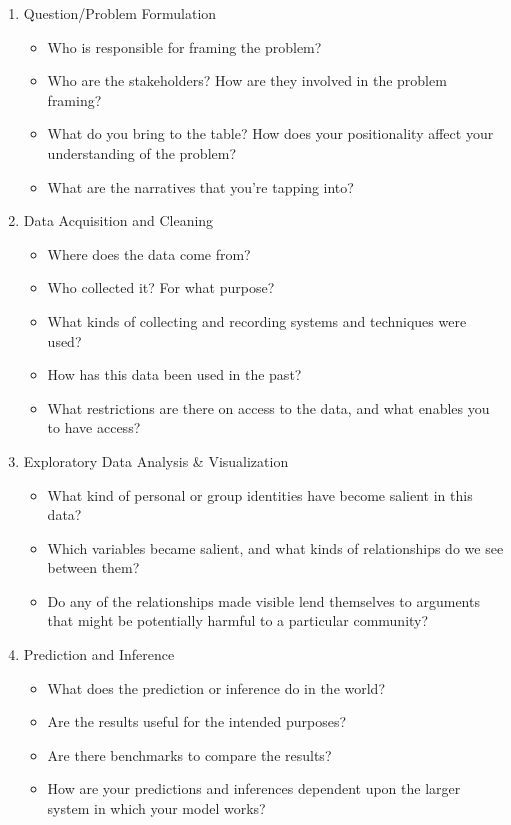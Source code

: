 \documentclass[
  letterpaper,
  DIV=11,
  numbers=noendperiod]{scrreprt}
\providecommand{\tightlist}{%
  \setlength{\itemsep}{0pt}\setlength{\parskip}{0pt}}\usepackage{longtable,booktabs,array}
\begin{document}
\begin{enumerate}
\def\labelenumi{\arabic{enumi}.}
\item
  Question/Problem Formulation

  \begin{itemize}
  \tightlist
  \item
    Who is responsible for framing the problem?
  \item
    Who are the stakeholders? How are they involved in the problem
    framing?
  \item
    What do you bring to the table? How does your positionality affect
    your understanding of the problem?
  \item
    What are the narratives that you're tapping into?
  \end{itemize}
\item
  Data Acquisition and Cleaning

  \begin{itemize}
  \tightlist
  \item
    Where does the data come from?
  \item
    Who collected it? For what purpose?
  \item
    What kinds of collecting and recording systems and techniques were
    used?
  \item
    How has this data been used in the past?
  \item
    What restrictions are there on access to the data, and what enables
    you to have access?
  \end{itemize}
\item
  Exploratory Data Analysis \& Visualization

  \begin{itemize}
  \tightlist
  \item
    What kind of personal or group identities have become salient in
    this data?
  \item
    Which variables became salient, and what kinds of relationships do
    we see between them?
  \item
    Do any of the relationships made visible lend themselves to
    arguments that might be potentially harmful to a particular
    community?
  \end{itemize}
\item
  Prediction and Inference

  \begin{itemize}
  \tightlist
  \item
    What does the prediction or inference do in the world?
  \item
    Are the results useful for the intended purposes?
  \item
    Are there benchmarks to compare the results?
  \item
    How are your predictions and inferences dependent upon the larger
    system in which your model works?
  \end{itemize}
\end{enumerate}
\end{document}
